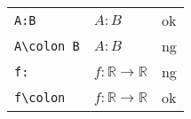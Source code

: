 \documentclass[preview]{standalone}
\newcommand{\tA}[1]{\textcolor{cA}{#1}}
\newcommand{\tD}[1]{\textcolor{cD}{#1}}
\begin{document}
\begin{table}[h]
    \centering
    \begin{tabular}{lll}
        \verb|A:B|       & $A:B$                               & \tA{ok} \\
        \verb|A\colon B| & $A\colon B$                         & \tD{ng} \\
        \verb|f:|        & $f:\mathbb{R} \to \mathbb{R}$       & \tD{ng} \\
        \verb|f\colon|   & $f\colon \mathbb{R} \to \mathbb{R}$ & \tA{ok}
    \end{tabular}
\end{table}
\end{document}
